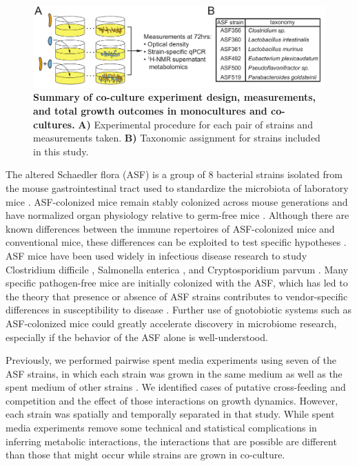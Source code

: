 \documentclass[11pt,onecolumn,notitlepage,openany,twoside]{book}
\begin{document}
\begin{refsection}
\begin{figure}[tb]
\centering
\includegraphics[width=\textwidth]{ch2_fig1}
\caption[Summary of co-culture experiment design, measurements, and total growth outcomes in monocultures and co-cultures.]{\textbf{Summary of co-culture experiment design, measurements, and total growth outcomes in monocultures and co-cultures.} \textbf{A)} Experimental procedure for each pair of strains and measurements taken. \textbf{B)} Taxonomic assignment for strains included in this study.}
\end{figure}

The altered Schaedler flora (ASF) is a group of 8 bacterial strains isolated from the mouse gastrointestinal tract used to standardize the microbiota of laboratory mice \cite{Wymore_Brand2015-ez}. ASF-colonized mice remain stably colonized across mouse generations and have normalized organ physiology relative to germ-free mice \cite{Wymore_Brand2015-ez}. Although there are known differences between the immune repertoires of ASF-colonized mice and conventional mice, these differences can be exploited to test specific hypotheses \cite{Geuking2011-fj,Ivanov2009-vl}. ASF mice have been used widely in infectious disease research to study Clostridium difficile \cite{Schwan2009-zo}, Salmonella enterica \cite{Brugiroux2016-vi}, and Cryptosporidium parvum \cite{Harp1992-wr}. Many specific pathogen-free mice are initially colonized with the ASF, which has led to the theory that presence or absence of ASF strains contributes to vendor-specific differences in susceptibility to disease \cite{Singer2000-tr}.  Further use of gnotobiotic systems such as ASF-colonized mice could greatly accelerate discovery in microbiome research, especially if the behavior of the ASF alone is well-understood.

Previously, we performed pairwise spent media experiments using seven of the ASF strains, in which each strain was grown in the same medium as well as the spent medium of other strains \cite{Biggs2017-fs}. We identified cases of putative cross-feeding and competition and the effect of those interactions on growth dynamics. However, each strain was spatially and temporally separated in that study. While spent media experiments remove some technical and statistical complications in inferring metabolic interactions, the interactions that are possible are different than those that might occur while strains are grown in co-culture.


\end{refsection}
\end{document}
